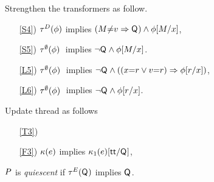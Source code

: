Strengthen the transformers as follow.
\begin{enumerate}
\item[\ref{S4})]
  $\aTr[\bEvs]\SB0(\aForm)$ implies $(\aExp{\neq}\aVal\limplies\Q{})\land\aForm[\aExp/\aLoc]$,
\item[\ref{S5})]
  $\aTr[\emptyset]\SB0(\aForm)\;$ implies $\lnot\Q{}\land \aForm[\aExp/\aLoc]$.
\item[\ref{L5})]
  $\aTr[\emptyset]\SB0(\aForm)\;$ implies $\lnot\Q{} \land((\aLoc{=}\aReg\lor\aVal{=}\aReg)\limplies\aForm[\aReg/\aLoc])$,
\item[\ref{L6})]
  $\aTr[\emptyset]\SB0(\aForm)\;$ implies $\lnot\Q{} \land\aForm[\aReg/\aLoc]$.
\end{enumerate}
Update thread as follows
\begin{enumerate}
\item[\ref{T3})]
\item[\ref{F3})]
  $\labelingForm\SB0(\aEv)$ implies $\labelingForm_1(\aEv)[\TRUE/\Q{}]$, 
\end{enumerate}

\begin{definition}
  $\aPS$ is \emph{quiescent} if $\aTr[\aEvs](\Q{})$ implies $\Q{}$.
\end{definition}


